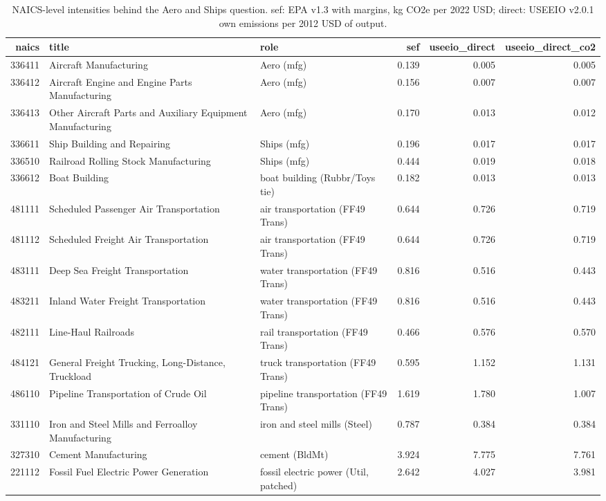 \begin{table}
\caption{NAICS-level intensities behind the Aero and Ships question. sef: EPA v1.3 with margins, kg CO2e per 2022 USD; direct: USEEIO v2.0.1 own emissions per 2012 USD of output.}
\label{tab:m4_aero_ships}
\begin{tabular}{rllrrr}
\toprule
naics & title & role & sef & useeio\_direct & useeio\_direct\_co2 \\
\midrule
336411 & Aircraft Manufacturing & Aero (mfg) & 0.139 & 0.005 & 0.005 \\
336412 & Aircraft Engine and Engine Parts Manufacturing & Aero (mfg) & 0.156 & 0.007 & 0.007 \\
336413 & Other Aircraft Parts and Auxiliary Equipment Manufacturing & Aero (mfg) & 0.170 & 0.013 & 0.012 \\
336611 & Ship Building and Repairing & Ships (mfg) & 0.196 & 0.017 & 0.017 \\
336510 & Railroad Rolling Stock Manufacturing & Ships (mfg) & 0.444 & 0.019 & 0.018 \\
336612 & Boat Building & boat building (Rubbr/Toys tie) & 0.182 & 0.013 & 0.013 \\
481111 & Scheduled Passenger Air Transportation & air transportation (FF49 Trans) & 0.644 & 0.726 & 0.719 \\
481112 & Scheduled Freight Air Transportation & air transportation (FF49 Trans) & 0.644 & 0.726 & 0.719 \\
483111 & Deep Sea Freight Transportation & water transportation (FF49 Trans) & 0.816 & 0.516 & 0.443 \\
483211 & Inland Water Freight Transportation & water transportation (FF49 Trans) & 0.816 & 0.516 & 0.443 \\
482111 & Line-Haul Railroads & rail transportation (FF49 Trans) & 0.466 & 0.576 & 0.570 \\
484121 & General Freight Trucking, Long-Distance, Truckload & truck transportation (FF49 Trans) & 0.595 & 1.152 & 1.131 \\
486110 & Pipeline Transportation of Crude Oil & pipeline transportation (FF49 Trans) & 1.619 & 1.780 & 1.007 \\
331110 & Iron and Steel Mills and Ferroalloy Manufacturing & iron and steel mills (Steel) & 0.787 & 0.384 & 0.384 \\
327310 & Cement Manufacturing & cement (BldMt) & 3.924 & 7.775 & 7.761 \\
221112 & Fossil Fuel Electric Power Generation & fossil electric power (Util, patched) & 2.642 & 4.027 & 3.981 \\
\bottomrule
\end{tabular}
\end{table}
